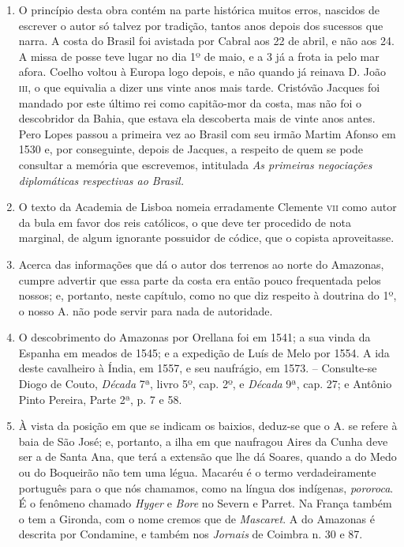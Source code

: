 \begin{enumerate}
\item  O princípio desta obra contém na parte histórica muitos erros, nascidos de escrever o 
autor só talvez por tradição, tantos anos depois dos sucessos que narra. A costa do 
Brasil foi avistada por Cabral aos 22 de abril, e não aos 24. A missa de posse teve lugar 
no dia 1º de maio, e a 3 já a frota ia pelo mar afora. Coelho voltou à Europa logo 
depois, e não quando já reinava D. João \textsc{iii}, o que equivalia a dizer uns vinte anos mais 
tarde. Cristóvão Jacques foi mandado por este último rei como capitão-mor da costa, 
mas não foi o descobridor da Bahia, que estava ela descoberta mais de vinte anos antes. 
Pero Lopes passou a primeira vez ao Brasil com seu irmão Martim Afonso em 1530 e, 
por conseguinte, depois de Jacques, a respeito de quem se pode consultar a memória 
que escrevemos, intitulada \textit{As primeiras negociações diplomáticas respectivas ao Brasil.}

\item O texto da Academia de Lisboa nomeia erradamente Clemente \textsc{vii} como autor da 
bula em favor dos reis católicos, o que deve ter procedido de nota marginal, de algum 
ignorante possuidor de códice, que o copista aproveitasse.

\item Acerca das informações que dá o autor dos terrenos ao norte do Amazonas, cumpre 
advertir que essa parte da costa era então pouco frequentada pelos nossos; e, portanto, 
neste capítulo, como no que diz respeito à doutrina do 1º, o nosso A. não pode servir 
para nada de autoridade.

\item O descobrimento do Amazonas por Orellana foi em 1541; a sua vinda da Espanha em 
meados de 1545; e a expedição de Luís de Melo por 1554. A ida deste cavalheiro à Índia, 
em 1557, e seu naufrágio, em 1573. -- Consulte-se Diogo de Couto, 
\textit{Década} 7ª, livro 5º, cap. 2º, e \textit{Década} 9ª, cap. 27; e Antônio Pinto Pereira, Parte 
2ª, p. 7 e 58.

\item  À vista da posição em que se indicam os baixios, deduz-se que o A.
se refere à baia de São José; e, portanto, a ilha em que naufragou Aires
da Cunha deve ser a de Santa Ana, que terá a extensão que lhe dá Soares,
quando a do Medo ou do Boqueirão não tem uma légua. Macaréu é o termo verdadeiramente português para o que nós chamamos, como na 
língua dos indígenas, \textit{pororoca}. É o fenômeno chamado \textit{Hyger} e \textit{Bore} no Severn e Parret. 
Na França também o tem a Gironda, com o nome cremos que de \textit{Mascaret}. A do Amazonas 
é descrita por Condamine, e também nos \textit{Jornais} de Coimbra n. 30 e 87.


\end{enumerate}
